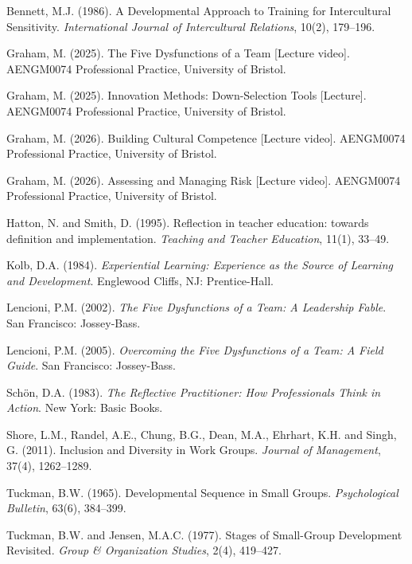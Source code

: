\documentclass[11pt,a4paper]{article}
\begin{document}
\begin{description}[leftmargin=1.5em, labelindent=0em, font=\normalfont]

\item Bennett, M.J. (1986). A Developmental Approach to Training for Intercultural Sensitivity. \textit{International Journal of Intercultural Relations}, 10(2), 179--196.

\item Graham, M. (2025). The Five Dysfunctions of a Team [Lecture video]. AENGM0074 Professional Practice, University of Bristol.

\item Graham, M. (2025). Innovation Methods: Down-Selection Tools [Lecture]. AENGM0074 Professional Practice, University of Bristol.

\item Graham, M. (2026). Building Cultural Competence [Lecture video]. AENGM0074 Professional Practice, University of Bristol.

\item Graham, M. (2026). Assessing and Managing Risk [Lecture video]. AENGM0074 Professional Practice, University of Bristol.

\item Hatton, N. and Smith, D. (1995). Reflection in teacher education: towards definition and implementation. \textit{Teaching and Teacher Education}, 11(1), 33--49.

\item Kolb, D.A. (1984). \textit{Experiential Learning: Experience as the Source of Learning and Development}. Englewood Cliffs, NJ: Prentice-Hall.

\item Lencioni, P.M. (2002). \textit{The Five Dysfunctions of a Team: A Leadership Fable}. San Francisco: Jossey-Bass.

\item Lencioni, P.M. (2005). \textit{Overcoming the Five Dysfunctions of a Team: A Field Guide}. San Francisco: Jossey-Bass.

\item Sch\"on, D.A. (1983). \textit{The Reflective Practitioner: How Professionals Think in Action}. New York: Basic Books.

\item Shore, L.M., Randel, A.E., Chung, B.G., Dean, M.A., Ehrhart, K.H. and Singh, G. (2011). Inclusion and Diversity in Work Groups. \textit{Journal of Management}, 37(4), 1262--1289.

\item Tuckman, B.W. (1965). Developmental Sequence in Small Groups. \textit{Psychological Bulletin}, 63(6), 384--399.

\item Tuckman, B.W. and Jensen, M.A.C. (1977). Stages of Small-Group Development Revisited. \textit{Group \& Organization Studies}, 2(4), 419--427.

\end{description}
\end{document}
